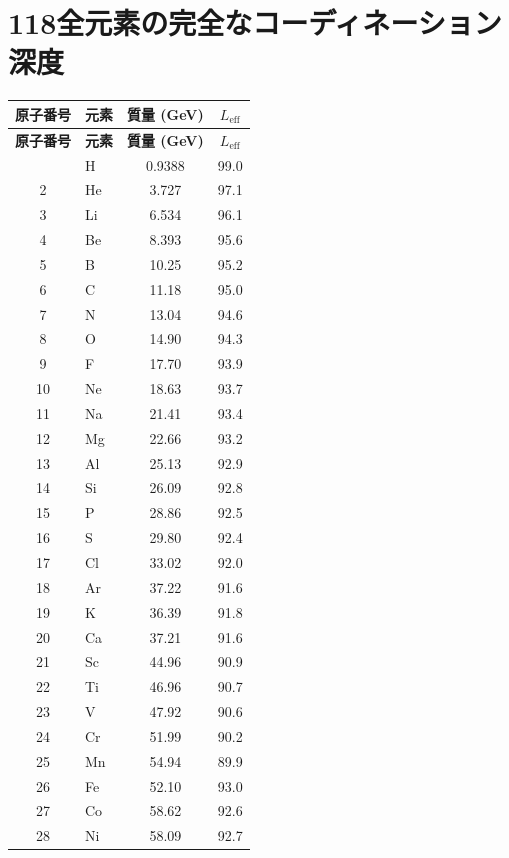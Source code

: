 \documentclass[12pt,a4paper]{article}
\begin{document}
	\section{118全元素の完全なコーディネーション深度}
	\label{sec:full_Leff}
	\begin{longtable}{c l c c}
		\toprule
		\textbf{原子番号} & \textbf{元素} & \textbf{質量 (GeV)} & \textbf{$L_{\mathrm{eff}}$} \\
		\midrule
		\endfirsthead
		\toprule
		\textbf{原子番号} & \textbf{元素} & \textbf{質量 (GeV)} & \textbf{$L_{\mathrm{eff}}$} \\
		\midrule
		\endhead
		\bottomrule
		\endfoot
		1  & H   & 0.9388 & 99.0 \\
		2  & He  & 3.727  & 97.1 \\
		3  & Li  & 6.534  & 96.1 \\
		4  & Be  & 8.393  & 95.6 \\
		5  & B   & 10.25  & 95.2 \\
		6  & C   & 11.18  & 95.0 \\
		7  & N   & 13.04  & 94.6 \\
		8  & O   & 14.90  & 94.3 \\
		9  & F   & 17.70  & 93.9 \\
		10 & Ne  & 18.63  & 93.7 \\
		11 & Na  & 21.41  & 93.4 \\
		12 & Mg  & 22.66  & 93.2 \\
		13 & Al  & 25.13  & 92.9 \\
		14 & Si  & 26.09  & 92.8 \\
		15 & P   & 28.86  & 92.5 \\
		16 & S   & 29.80  & 92.4 \\
		17 & Cl  & 33.02  & 92.0 \\
		18 & Ar  & 37.22  & 91.6 \\
		19 & K   & 36.39  & 91.8 \\
		20 & Ca  & 37.21  & 91.6 \\
		21 & Sc  & 44.96  & 90.9 \\
		22 & Ti  & 46.96  & 90.7 \\
		23 & V   & 47.92  & 90.6 \\
		24 & Cr  & 51.99  & 90.2 \\
		25 & Mn  & 54.94  & 89.9 \\
		26 & Fe  & 52.10  & 93.0 \\
		27 & Co  & 58.62  & 92.6 \\
		28 & Ni  & 58.09  & 92.7 \\

\end{longtable}
\end{document}

